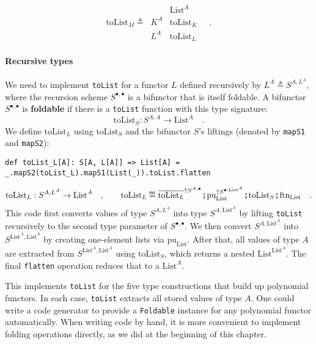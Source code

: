 \noindent ~\vspace{-2\baselineskip}
\[
\text{toList}_{M}\triangleq\,\begin{array}{|c||c|}
 & \text{List}^{A}\\
\hline K^{A} & \text{toList}_{K}\\
L^{A} & \text{toList}_{L}
\end{array}\quad.
\]
\vspace{-0.6\baselineskip}


\paragraph{Recursive types}

We need to implement \lstinline!toList! for a functor $L$ defined
recursively by $L^{A}\triangleq S^{A,L^{A}}$, where the recursion
scheme $S^{\bullet,\bullet}$ is a bifunctor that is itself foldable.
A bifunctor $S^{\bullet,\bullet}$ is \textbf{foldable}
if there is a \lstinline!toList! function with this type signature:
\[
\text{toList}_{S}:S^{A,A}\rightarrow\text{List}^{A}\quad.
\]
We define $\text{toList}_{L}$ using $\text{toList}_{S}$ and the
bifunctor $S$\textsf{'}s liftings (denoted by \lstinline!mapS1! and \lstinline!mapS2!):
\begin{lstlisting}
def toList_L[A]: S[A, L[A]] => List[A] = _.mapS2(toList_L).mapS1(List(_)).toList.flatten
\end{lstlisting}
\[
\text{toList}_{L}:S^{A,L^{A}}\rightarrow\text{List}^{A}\quad,\quad\quad\text{toList}_{L}\triangleq\overline{\text{toList}_{L}}^{\uparrow S^{A,\bullet}}\bef\text{pu}_{\text{List}}^{\uparrow S^{\bullet,\text{List}^{A}}}\bef\text{toList}_{S}\bef\text{ftn}_{\text{List}}\quad.
\]
This code first converts values of type $S^{A,L^{A}}$ into type $S^{A,\text{List}^{A}}$
by lifting \lstinline!toList! recursively to the second type parameter
of $S^{\bullet,\bullet}$. We then convert $S^{A,\text{List}^{A}}$
into $S^{\text{List}^{A},\text{List}^{A}}$ by creating one-element
lists via $\text{pu}_{\text{List}}$. After that, all values of type
$A$ are extracted from $S^{\text{List}^{A},\text{List}^{A}}$ using
$\text{toList}_{S}$, which returns a nested $\text{List}^{\text{List}^{A}}$.
The final \lstinline!flatten! operation reduces that to a $\text{List}^{A}$.

This implements \lstinline!toList! for the five type constructions
that build up polynomial functors. In each case, \lstinline!toList!
extracts all stored values of type $A$. One could write a code generator
to provide a \lstinline!Foldable! instance for any polynomial functor
automatically. When writing code by hand, it is more convenient to
implement folding operations directly, as we did at the beginning
of this chapter.

